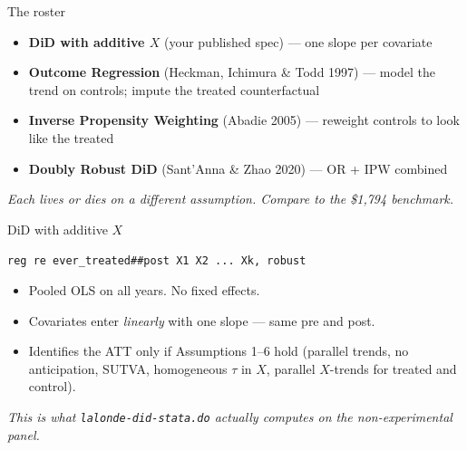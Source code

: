 \documentclass[11pt,aspectratio=169]{beamer}
\begin{document}
\begin{frame}{The roster}
\vspace{0.5em}
\begin{itemize}
  \item \textbf{DiD with additive $X$} (your published spec) --- one slope per covariate
  \item \textbf{Outcome Regression} (Heckman, Ichimura \& Todd 1997) --- model the trend on controls; impute the treated counterfactual
  \item \textbf{Inverse Propensity Weighting} (Abadie 2005) --- reweight controls to look like the treated
  \item \textbf{Doubly Robust DiD} (Sant'Anna \& Zhao 2020) --- OR + IPW combined
\end{itemize}
\vspace{0.4em}
\begin{center}
\small\color{warmgray}\itshape
Each lives or dies on a different assumption. \;Compare to the \$1{,}794 benchmark.
\end{center}
\end{frame}

\begin{frame}[fragile]{DiD with additive $X$}
\vspace{0.6em}
\begin{center}
\small
\verb|reg re ever_treated##post X1 X2 ... Xk, robust|
\end{center}
\vspace{0.6em}
\begin{itemize}\small
  \item Pooled OLS on all years. \;No fixed effects.
  \item Covariates enter \textit{linearly} with one slope --- same pre and post.
  \item Identifies the ATT only if Assumptions 1--6 hold (parallel trends, no anticipation, SUTVA, homogeneous $\tau$ in $X$, parallel $X$-trends for treated and control).
\end{itemize}
\vspace{0.4em}
\begin{center}
\small\color{warmgray}\itshape
This is what \texttt{lalonde-did-stata.do} actually computes on the non-experimental panel.
\end{center}
\end{frame}
\end{document}
